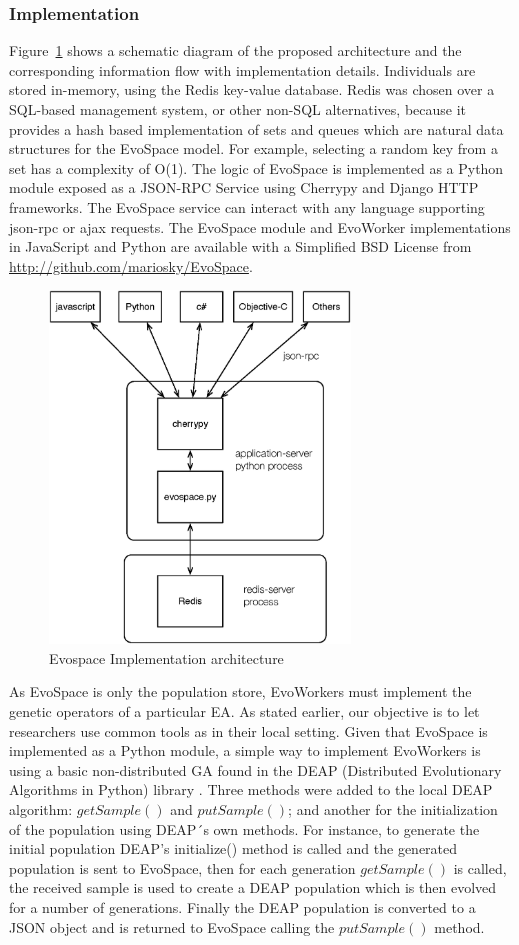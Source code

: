 \subsubsection{Implementation}
Figure~\ref{fig:evospace} shows a schematic diagram of the proposed architecture and the corresponding information flow with implementation details.
Individuals are stored in-memory, using the Redis key-value database.
Redis was chosen over a SQL-based management system, or other non-SQL alternatives, because it provides a hash based implementation of sets and queues which are natural data structures for the EvoSpace model. For example, selecting a random key from a set has a complexity of O(1). The logic of EvoSpace is implemented as a Python module exposed as a 
JSON-RPC Service using Cherrypy and Django HTTP frameworks.
The EvoSpace service can interact with any language supporting json-rpc or ajax requests. The EvoSpace module and EvoWorker implementations in JavaScript and Python are available with a Simplified BSD License from \url{http://github.com/mariosky/EvoSpace}.

\begin{figure}[t]
    \centering
        \includegraphics[width=8cm]{evospace.eps}
    \caption{Evospace Implementation architecture }
    \label{fig:evospace}
\end{figure}

As EvoSpace is only the population store, EvoWorkers must implement the genetic operators of a particular EA.
As stated earlier, our objective is to let researchers use common tools as in their local setting.
Given that EvoSpace is implemented as a Python module, a simple way to implement EvoWorkers is using a basic non-distributed GA found in the DEAP (Distributed Evolutionary Algorithms in Python) library \cite{DEAP_JMLR2012}.  Three methods were added to the local DEAP algorithm: $getSample()$ and  $putSample()$; and  another for the  initialization of the population using DEAP´s own methods.
For instance, to generate the initial population DEAP's initialize() method  is called and the generated population is sent to EvoSpace, then for each generation $getSample()$ is called, the received sample is used to create a DEAP population which is then evolved for a number of generations. Finally the DEAP population is converted to a JSON object and is returned to EvoSpace calling the $putSample()$ method.   

